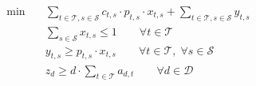 \begin{align}
  \min\quad & \sum_{t \in \mathcal{T}, s \in \mathcal{S}} c_{t,s} \cdot p_{t,s} \cdot x_{t,s} + \sum_{t \in \mathcal{T}, s \in \mathcal{S}} y_{t,s} \tag{total\_delay} \\
  & \sum_{s \in \mathcal{S}} x_{t,s} \le 1 \qquad \forall t \in \mathcal{T} \tag{short\_turning} \\
  & y_{t,s} \ge p_{t,s} \cdot x_{t,s} \qquad \forall t \in \mathcal{T},\; \forall s \in \mathcal{S} \tag{passenger\_routing} \\
  & z_{d} \ge d \cdot \sum_{t \in \mathcal{T}} a_{d,t} \qquad \forall d \in \mathcal{D} \tag{disruption\_length} \\
\end{align}